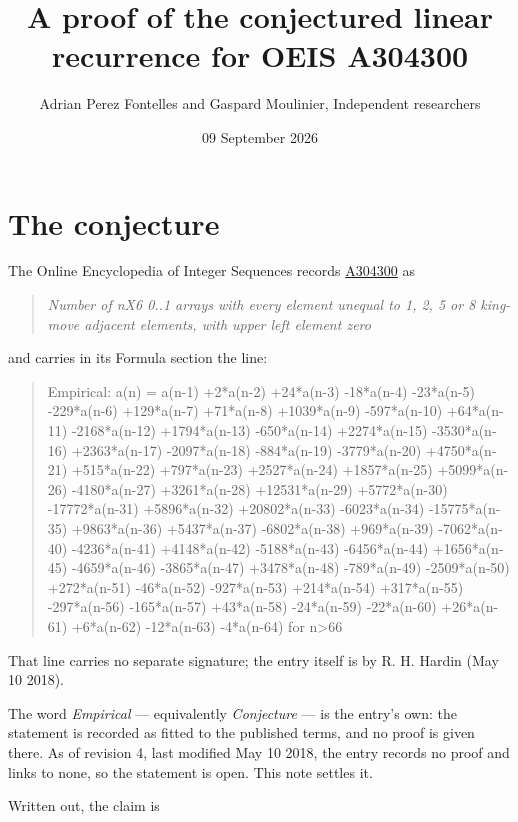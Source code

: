 \documentclass[11pt]{article}
\title{A proof of the conjectured linear recurrence for OEIS A304300}
\author{Adrian Perez Fontelles and Gaspard Moulinier, Independent researchers}
\date{09 September 2026}
\theoremstyle{definition}
\begin{document}
\maketitle
\section{The conjecture}

The Online Encyclopedia of Integer Sequences records \href{https://oeis.org/A304300}{A304300} as

\begin{quote}\itshape Number of nX6 0..1 arrays with every element unequal to 1, 2, 5 or 8 king-move adjacent elements, with upper left element zero\end{quote}

and carries in its Formula section the line:

\begin{quote}\ttfamily Empirical: a(n) = a(n-1) +2*a(n-2) +24*a(n-3) -18*a(n-4) -23*a(n-5) -229*a(n-6) +129*a(n-7) +71*a(n-8) +1039*a(n-9) -597*a(n-10) +64*a(n-11) -2168*a(n-12) +1794*a(n-13) -650*a(n-14) +2274*a(n-15) -3530*a(n-16) +2363*a(n-17) -2097*a(n-18) -884*a(n-19) -3779*a(n-20) +4750*a(n-21) +515*a(n-22) +797*a(n-23) +2527*a(n-24) +1857*a(n-25) +5099*a(n-26) -4180*a(n-27) +3261*a(n-28) +12531*a(n-29) +5772*a(n-30) -17772*a(n-31) +5896*a(n-32) +20802*a(n-33) -6023*a(n-34) -15775*a(n-35) +9863*a(n-36) +5437*a(n-37) -6802*a(n-38) +969*a(n-39) -7062*a(n-40) -4236*a(n-41) +4148*a(n-42) -5188*a(n-43) -6456*a(n-44) +1656*a(n-45) -4659*a(n-46) -3865*a(n-47) +3478*a(n-48) -789*a(n-49) -2509*a(n-50) +272*a(n-51) -46*a(n-52) -927*a(n-53) +214*a(n-54) +317*a(n-55) -297*a(n-56) -165*a(n-57) +43*a(n-58) -24*a(n-59) -22*a(n-60) +26*a(n-61) +6*a(n-62) -12*a(n-63) -4*a(n-64) for n>66\end{quote}

That line carries no separate signature; the entry itself is by R. H. Hardin (May 10 2018).

The word {\itshape Empirical} --- equivalently {\itshape Conjecture} --- is the entry's own: the statement is recorded as fitted to the published terms, and no proof is given there. As of revision 4, last modified May 10 2018, the entry records no proof and links to none, so the statement is open. This note settles it.

Written out, the claim is
\end{document}
